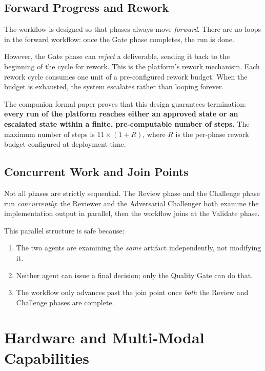 \documentclass[12pt]{article}
\begin{document}
\subsection{Forward Progress and Rework}

The workflow is designed so that phases always move \emph{forward}.
There are no loops in the forward workflow: once the Gate phase
completes, the run is done.

However, the Gate phase can \emph{reject} a deliverable, sending it
back to the beginning of the cycle for rework.
This is the platform's rework mechanism.
Each rework cycle consumes one unit of a pre-configured rework budget.
When the budget is exhausted, the system escalates rather than looping
forever.

The companion formal paper proves that this design guarantees
termination: \textbf{every run of the platform reaches either an
approved state or an escalated state within a finite, pre-computable
number of steps.}
The maximum number of steps is $11 \times (1 + R)$, where $R$ is the
per-phase rework budget configured at deployment time.

\subsection{Concurrent Work and Join Points}

Not all phases are strictly sequential.
The Review phase and the Challenge phase run \emph{concurrently}: the
Reviewer and the Adversarial Challenger both examine the
implementation output in parallel, then the workflow joins at the
Validate phase.

This parallel structure is safe because:
\begin{enumerate}
    \item The two agents are examining the \emph{same} artifact
          independently, not modifying it.
    \item Neither agent can issue a final decision; only the Quality
          Gate can do that.
    \item The workflow only advances past the join point once
          \emph{both} the Review and Challenge phases are complete.
\end{enumerate}

\section{Hardware and Multi-Modal Capabilities}
\label{sec:hardware}
\end{document}
